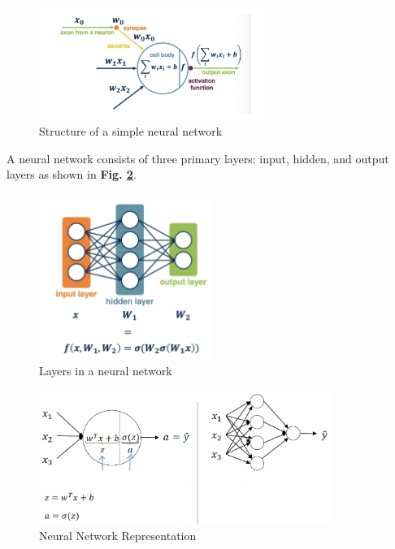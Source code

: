 \documentclass[letterpaper,12pt,notitlepage,twoside]{report}
\begin{document}
\begin{figure}[h]
	\centering
	\includegraphics[width=0.65\textwidth]{Images/Activation function.png}
	\caption{Structure of a simple neural network}
	\label{fig:12}
\end{figure}

A neural network consists of three primary layers: input, hidden, and output layers as shown in \textbf{Fig. \ref{fig:13}}.

\begin{figure}[h]
	\centering
	\includegraphics[width=0.5\textwidth]{Images/Layers in a neural network.png}
	\caption{Layers in a neural network}
	\label{fig:13}
\end{figure}

\begin{figure}[h]
	\centering
	\includegraphics[width=0.85\textwidth]{Images/Neural Network Representation.png}
	\caption{Neural Network Representation}
	\label{fig:14}
\end{figure}
\FloatBarrier
\end{document}
